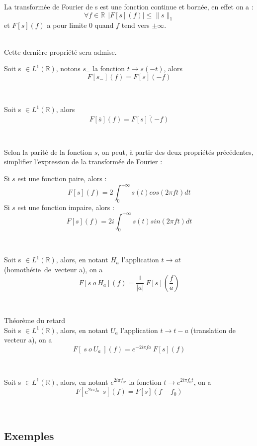 \begin{prot} La transformée de Fourier de s est une fonction continue et bornée, en effet on a : 
$$\forall f \in \mathbb{R}~~ |{F[s]}(f)|\leq \|s\|_1$$ 
et $F[s](f)$ a pour limite 0 quand $f$ tend vers $\pm \infty$.
\end{prot}
~~\\
Cette dernière propriété sera admise.
~~\\

\begin{prot} Soit s $\in L^1(\mathbb{R})$, notons $s_-$ la fonction $t\rightarrow s(-t)$, alors
$$F[s_-](f)=F[s](-f)$$ 
\end{prot}
~~\

\begin{prot} Soit s $\in L^1(\mathbb{R})$, alors
$$F[\overline{s}](f)=\overline{F[s](-f)}$$ 
\end{prot}
~~\

Selon la parité de la fonction $s$, on peut, à partir des deux propriétés précédentes, simplifier l'expression de la transformée de Fourier :
\begin{prot}
Si $s$ est une fonction paire, alors :
$$F[s](f)=2\int^{+\infty}_{0}s(t)cos(2\pi ft)dt$$
Si $s$ est une fonction impaire, alors :
$$F[s](f)=2i\int^{+\infty}_{0}s(t)sin(2\pi ft)dt$$\end{prot}
~~\\

\begin{prot} 
Soit s $\in L^1(\mathbb{R})$, alors, en notant $H_a$ l'application $t\rightarrow at$ (homothétie\ de\ vecteur a), on a
$$F[{s\ o\ H_a}](f)=\frac{1}{|a|}\ F[s](\frac{f}{a})$$ 
\end{prot}
~~\\

\begin{prot} Théorème du retard
~~\\
Soit s $\in L^1(\mathbb{R})$, alors, en notant $U_a$ l'application $t\rightarrow t-a$ (translation de vecteur a), on a
$$F[\ s\ o\ U_a\ ](f)=e^{-2i\pi fa}\ F[s](f)$$ 
\end{prot}
~~\

\begin{prot} 
Soit s $\in L^1(\mathbb{R})$, alors, en notant $e^{2i\pi f_0.}$ la fonction $t\rightarrow e^{2i\pi f_0t}$, on a
$$F[e^{2i\pi f_0.}\ s](f)=F[s](f-f_0)$$ 
\end{prot}
~~\

\subsection{Exemples}
